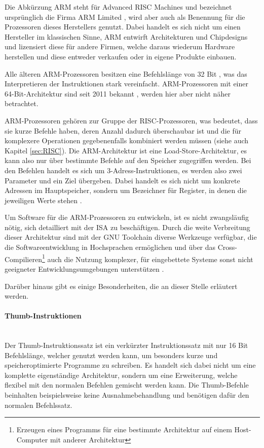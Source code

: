 \documentclass[11pt,a4paper,titlepage]{article}
\begin{document}
Die Abkürzung ARM steht für Advanced RISC Machines und bezeichnet ursprünglich die Firma ARM Limited \cite{ARM}, wird aber auch als Benennung für die Prozessoren dieses Herstellers genutzt. Dabei handelt es sich nicht um einen Hersteller im klassischen Sinne, ARM entwirft Architekturen und Chipdesigns und lizensiert diese für andere Firmen, welche daraus wiederum Hardware herstellen und diese entweder verkaufen oder in eigene Produkte einbauen.

Alle älteren ARM-Prozessoren besitzen eine Befehlslänge von 32 Bit \cite[S. 14]{Hennessy}, was das Interpretieren der Instruktionen stark vereinfacht. ARM-Prozessoren mit einer 64-Bit-Architektur sind seit 2011 bekannt \cite{ARM32_64}, werden hier aber nicht näher betrachtet.

ARM-Prozessoren gehören zur Gruppe der RISC-Prozessoren, was bedeutet, dass sie kurze Befehle haben, deren Anzahl dadurch überschaubar ist und die für komplexere Operationen gegebenenfalls kombiniert werden müssen (siehe auch Kapitel \ref{sec:RISC}). Die ARM-Architektur ist eine Load-Store-Architektur, es kann also nur über bestimmte Befehle auf den Speicher zugegriffen werden. Bei den Befehlen handelt es sich um 3-Adress-Instruktionen, es werden also zwei Parameter und ein Ziel übergeben. Dabei handelt es sich nicht um konkrete Adressen im Hauptspeicher, sondern um Bezeichner für Register, in denen die jeweiligen Werte stehen \cite[S. 17]{Furber}. 

Um Software für die ARM-Prozessoren zu entwickeln, ist es nicht zwangsläufig nötig, sich detailliert mit der ISA zu beschäftigen. Durch die weite Verbreitung dieser Architektur sind mit der GNU Toolchain diverse Werkzeuge verfügbar, die die Softwareentwicklung in Hochsprachen ermöglichen und über das Cross-Compilieren\footnote{Erzeugen eines Programms für eine bestimmte Architektur auf einem Host-Computer mit anderer Architektur} auch die Nutzung komplexer, für eingebettete Systeme sonst nicht geeigneter Entwicklungsumgebungen unterstützen \cite{gnu-arm}.

Darüber hinaus gibt es einige Besonderheiten, die an dieser Stelle erläutert werden.

\paragraph{Thumb-Instruktionen}$\;$\\

Der Thumb-Instruktionssatz ist ein verkürzter Instruktionssatz mit nur 16 Bit Befehlslänge, welcher genutzt werden kann, um besonders kurze und speicheroptimierte Programme zu schreiben. Es handelt sich dabei nicht um eine komplette eigenständige Architektur, sondern um eine Erweiterung, welche flexibel mit den normalen Befehlen gemischt werden kann. Die Thumb-Befehle beinhalten beispielsweise keine Ausnahmebehandlung und benötigen dafür den normalen Befehlssatz.
\end{document}
